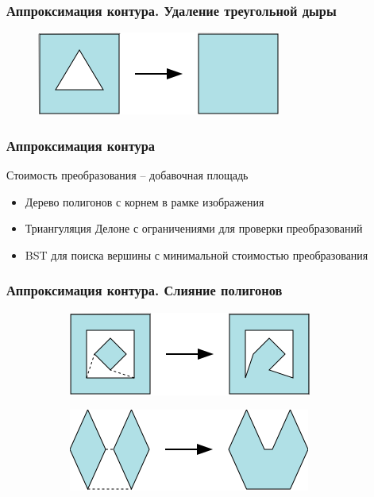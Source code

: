 \documentclass[10pt, unicode]{beamer}
\begin{document}
    \begin{frame}
        \frametitle{Аппроксимация контура. Удаление треугольной дыры}
        \begin{figure}[H]
            \centering
            \includegraphics[scale=0.8]{images/remove_triangular_hole.png}
        \end{figure}
    \end{frame}
    \begin{frame}
        \frametitle{Аппроксимация контура}
        Стоимость преобразования -- добавочная площадь
        \begin{itemize}
            \item Дерево полигонов с корнем в рамке изображения
            \item Триангуляция Делоне с ограничениями для проверки преобразований
            \item BST для поиска вершины с минимальной стоимостью преобразования
        \end{itemize}
    \end{frame}
    \begin{frame}
        \frametitle{Аппроксимация контура. Слияние полигонов}
        \begin{figure}[H]
            \centering
            \begin{subfigure}[t]{\linewidth}
                \centering
                \includegraphics[scale=0.8]{images/polygonmerge.png}
                \vspace*{1cm}
            \end{subfigure}
            \begin{subfigure}[t]{\linewidth}
                \centering
                \includegraphics[scale=0.8]{images/polygonmerge2.png}
            \end{subfigure}
        \end{figure}
    \end{frame}
\end{document}
